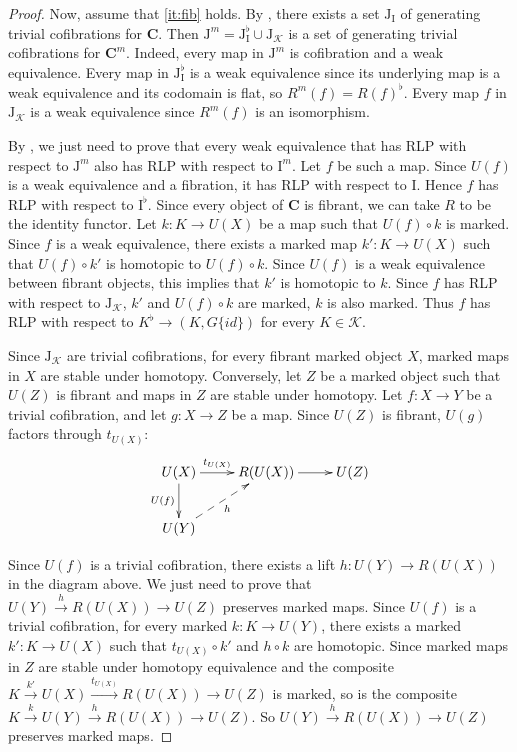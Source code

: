 \documentclass[reqno]{amsart}
\theoremstyle{definition}
\theoremstyle{remark}
\newcommand{\cat}[1]{\mathbf{#1}}
\newcommand{\C}{\cat{C}}
\newcommand{\I}{\mathrm{I}}
\newcommand{\J}{\mathrm{J}}
\numberwithin{figure}{section}
\begin{document}
\begin{proof}
Now, assume that \eqref{it:fib} holds.
By \cite[Corollary~3.2]{f-model-structures}, there exists a set $\J_\I$ of generating trivial cofibrations for $\C$.
Then $\J^m = \J_\I^\flat \cup \J_\mathcal{K}$ is a set of generating trivial cofibrations for $\C^m$.
Indeed, every map in $\J^m$ is cofibration and a weak equivalence.
Every map in $\J_\I^\flat$ is a weak equivalence since its underlying map is a weak equivalence and its codomain is flat, so $R^m(f) = R(f)^\flat$.
Every map $f$ in $\J_\mathcal{K}$ is a weak equivalence since $R^m(f)$ is an isomorphism.

By , we just need to prove that every weak equivalence that has RLP with respect to $\J^m$ also has RLP with respect to $\I^m$.
Let $f$ be such a map.
Since $U(f)$ is a weak equivalence and a fibration, it has RLP with respect to $\I$.
Hence $f$ has RLP with respect to $\I^\flat$.
Since every object of $\C$ is fibrant, we can take $R$ to be the identity functor.
Let $k : K \to U(X)$ be a map such that $U(f) \circ k$ is marked.
Since $f$ is a weak equivalence, there exists a marked map $k' : K \to U(X)$ such that $U(f) \circ k'$ is homotopic to $U(f) \circ k$.
Since $U(f)$ is a weak equivalence between fibrant objects, this implies that $k'$ is homotopic to $k$.
Since $f$ has RLP with respect to $\J_\mathcal{K}$, $k'$ and $U(f) \circ k$ are marked, $k$ is also marked.
Thus $f$ has RLP with respect to $K^\flat \to (K, G \{id\})$ for every $K \in \mathcal{K}$.

Since $\J_\mathcal{K}$ are trivial cofibrations, for every fibrant marked object $X$, marked maps in $X$ are stable under homotopy.
Conversely, let $Z$ be a marked object such that $U(Z)$ is fibrant and maps in $Z$ are stable under homotopy.
Let $f : X \to Y$ be a trivial cofibration, and let $g : X \to Z$ be a map.
Since $U(Z)$ is fibrant, $U(g)$ factors through $t_{U(X)}$:
\[ \xymatrix{ U(X) \ar[r]^-{t_{U(X)}} \ar[d]_{U(f)} & R(U(X)) \ar[r] & U(Z) \\
              U(Y) \ar@{-->}[ur]_h
            } \]

Since $U(f)$ is a trivial cofibration, there exists a lift $h : U(Y) \to R(U(X))$ in the diagram above.
We just need to prove that $U(Y) \xrightarrow{h} R(U(X)) \to U(Z)$ preserves marked maps.
Since $U(f)$ is a trivial cofibration, for every marked $k : K \to U(Y)$, there exists a marked $k' : K \to U(X)$
such that $t_{U(X)} \circ k'$ and $h \circ k$ are homotopic.
Since marked maps in $Z$ are stable under homotopy equivalence and the composite $K \xrightarrow{k'} U(X) \xrightarrow{t_{U(X)}} R(U(X)) \to U(Z)$ is marked,
so is the composite $K \xrightarrow{k} U(Y) \xrightarrow{h} R(U(X)) \to U(Z)$.
So $U(Y) \xrightarrow{h} R(U(X)) \to U(Z)$ preserves marked maps.


\end{proof}
\end{document}
